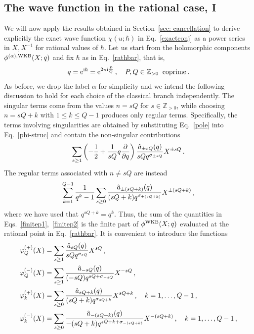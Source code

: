 \documentclass[a4paper,11pt]{article}
\theoremstyle{definition}
\def\IZ{{\mathbb Z}}
\newcommand{\re}{{\rm e}}
\newcommand{\ri}{{\rm i}}
\newcommand{\be}{\begin{equation}}
\newcommand{\ee}{\end{equation}}
\begin{document}
\subsection{The wave function in the rational case, I} \label{sec: rational1}
We will now apply the results obtained in Section~\ref{sec: cancellation} to derive explicitly the exact wave function $\chi(u;\hbar)$ in Eq.~\eqref{exactconj} as a power series in $X, X^{-1}$ for rational values of $\hbar$. 
Let us start from the holomorphic components $\phi^{(\alpha), {\rm WKB}} (X; q)$ and fix $\hbar$ as in Eq.~\eqref{rathbar}, that is, 
\be
q=\re^{\ri \hbar}=\re^{2 \pi \ri {P \over Q}} \, , \quad  P,Q \in \IZ_{>0} \; \; \text{coprime} \, .
\ee
As before, we drop the label $\alpha$ for simplicity and we intend the following discussion to hold for each choice of the classical branch independently. The singular terms come from the values $n = sQ$ for $s \in \IZ_{>0}$, while choosing $n= sQ+k$ with $1 \le k \le Q-1$ produces only regular terms.
Specifically, the terms involving singularities are obtained by substituting Eq.~\eqref{pole} into Eq.~\eqref{phi-struc} and contain the non-singular contributions
%
\be \label{finitep1}
\sum_{s \ge 1} \left( -{1\over 2} +{1\over  sQ} q {\partial \over \partial q} \right) \frac{\hat a_{\pm s Q} (q)}{s Q q^{\sigma_{\pm sQ}}}  X^{\pm sQ} \, .
\ee
%
The regular terms associated with $n \ne sQ$ are instead 
%
\be \label{finitep2}
\sum_{k=1}^{Q-1} \frac{1}{q^k-1} \sum_{s \ge 0} {\hat a_{\pm (s Q +k)} (q) \over (sQ+k) q^{\sigma_{\pm (sQ+k)}}} X^{\pm (sQ+k)} \, ,
\ee
%
where we have used that $q^{sQ+k}= q^k$. Thus, the sum of the quantities in Eqs.~\eqref{finitep1},~\eqref{finitep2} is the finite part of $\phi^{\rm WKB}(X;q)$ evaluated at the rational point in Eq.~\eqref{rathbar}.
It is convenient to introduce the functions
%
\begin{subequations} \label{phifunct-parts}
\begin{align}
\varphi^{(+)}_Q(X)&= \sum_{s \ge 1} {\hat a_{s Q} (q) \over sQ q^{\sigma_{sQ}}} X^{sQ}    \, , \\
\varphi^{(-)}_Q(X)&= \sum_{s \ge 1}  {\hat a_{-s Q} (q) \over (-sQ) q^{sQ + \sigma_{-sQ}}} X^{-sQ}   \, , \\
\varphi^{(+)}_k(X)&=  \sum_{s \ge 0} {\hat a_{s Q +k} (q) \over (sQ+k) q^{\sigma_{sQ+k}}} X^{sQ+k}\, , \quad k=1, \dots, Q-1 \, , \\
\varphi^{(-)}_k(X)&=  \sum_{s \ge 0} {\hat a_{-(s Q +k)} (q) \over -(sQ+k) q^{sQ+k + \sigma_{-(sQ+k)}}} X^{-(sQ+k)}\, , \quad k=1, \dots, Q-1 \, ,
\end{align}
\end{subequations}
\end{document}
